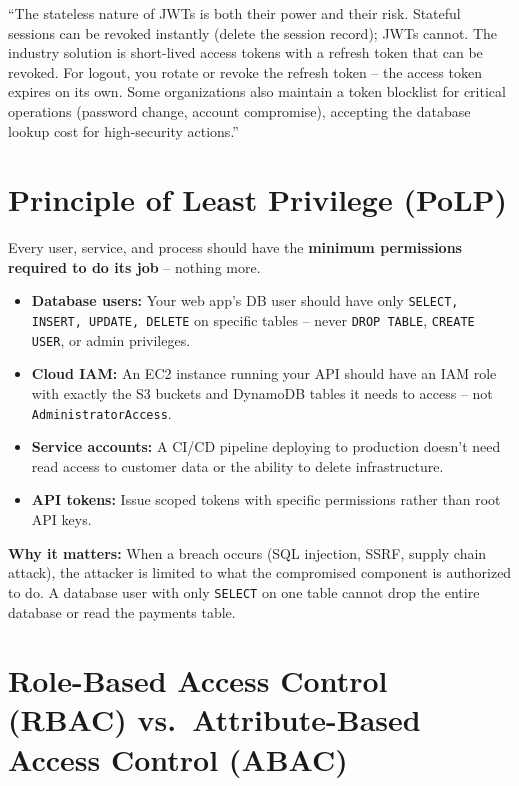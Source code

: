 \documentclass[11pt, letterpaper]{article}
\newcommand{\talkingpoint}[1]{%
  \begin{tcolorbox}[colback=talkbg, colframe=talkborder,
    title={\bfseries Interview Talking Point}, arc=3pt, boxrule=1pt]
  #1
  \end{tcolorbox}%
}
\begin{document}
\talkingpoint{``The stateless nature of JWTs is both their power and their risk. Stateful sessions can be revoked instantly (delete the session record); JWTs cannot. The industry solution is short-lived access tokens with a refresh token that can be revoked. For logout, you rotate or revoke the refresh token -- the access token expires on its own. Some organizations also maintain a token blocklist for critical operations (password change, account compromise), accepting the database lookup cost for high-security actions.''}

\section*{Principle of Least Privilege (PoLP)}

Every user, service, and process should have the \textbf{minimum permissions required to do its job} -- nothing more.

\begin{itemize}[noitemsep]
  \item \textbf{Database users:} Your web app's DB user should have only \texttt{SELECT, INSERT, UPDATE, DELETE} on specific tables -- never \texttt{DROP TABLE}, \texttt{CREATE USER}, or admin privileges.
  \item \textbf{Cloud IAM:} An EC2 instance running your API should have an IAM role with exactly the S3 buckets and DynamoDB tables it needs to access -- not \texttt{AdministratorAccess}.
  \item \textbf{Service accounts:} A CI/CD pipeline deploying to production doesn't need read access to customer data or the ability to delete infrastructure.
  \item \textbf{API tokens:} Issue scoped tokens with specific permissions rather than root API keys.
\end{itemize}

\textbf{Why it matters:} When a breach occurs (SQL injection, SSRF, supply chain attack), the attacker is limited to what the compromised component is authorized to do. A database user with only \texttt{SELECT} on one table cannot drop the entire database or read the payments table.

\section*{Role-Based Access Control (RBAC) vs.\ Attribute-Based Access Control (ABAC)}
\end{document}
